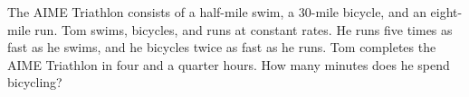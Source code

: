 The AIME Triathlon consists of a half-mile swim, a $30$-mile bicycle, and an eight-mile run. Tom swims, bicycles, and runs at constant rates. He runs five times as fast as he swims, and he bicycles twice as fast as he runs. Tom completes the AIME Triathlon in four and a quarter hours. How many minutes does he spend bicycling?